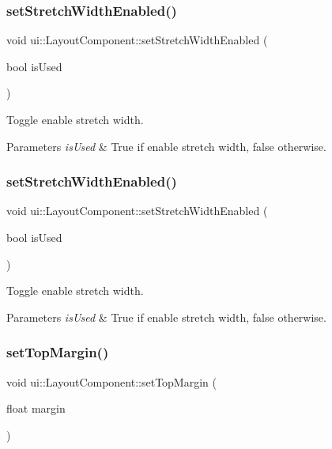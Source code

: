 \subsubsection{\texorpdfstring{set\+Stretch\+Width\+Enabled()}{setStretchWidthEnabled()}\hspace{0.1cm}{\footnotesize\ttfamily [1/2]}}
{\footnotesize\ttfamily void ui\+::\+Layout\+Component\+::set\+Stretch\+Width\+Enabled (\begin{DoxyParamCaption}\item[{bool}]{is\+Used }\end{DoxyParamCaption})}

Toggle enable stretch width. 
\begin{DoxyParams}{Parameters}
{\em is\+Used} & True if enable stretch width, false otherwise. \\
\hline
\end{DoxyParams}
\mbox{\label{classui_1_1LayoutComponent_a85301b7c5ca5edf04c2d1c30ac925e5e}} 
\subsubsection{\texorpdfstring{set\+Stretch\+Width\+Enabled()}{setStretchWidthEnabled()}\hspace{0.1cm}{\footnotesize\ttfamily [2/2]}}
{\footnotesize\ttfamily void ui\+::\+Layout\+Component\+::set\+Stretch\+Width\+Enabled (\begin{DoxyParamCaption}\item[{bool}]{is\+Used }\end{DoxyParamCaption})}

Toggle enable stretch width. 
\begin{DoxyParams}{Parameters}
{\em is\+Used} & True if enable stretch width, false otherwise. \\
\hline
\end{DoxyParams}
\mbox{\label{classui_1_1LayoutComponent_a3f88a5fedef99e54d7a78794f4bd193a}} 
\subsubsection{\texorpdfstring{set\+Top\+Margin()}{setTopMargin()}\hspace{0.1cm}{\footnotesize\ttfamily [1/2]}}
{\footnotesize\ttfamily void ui\+::\+Layout\+Component\+::set\+Top\+Margin (\begin{DoxyParamCaption}\item[{float}]{margin }\end{DoxyParamCaption})}

